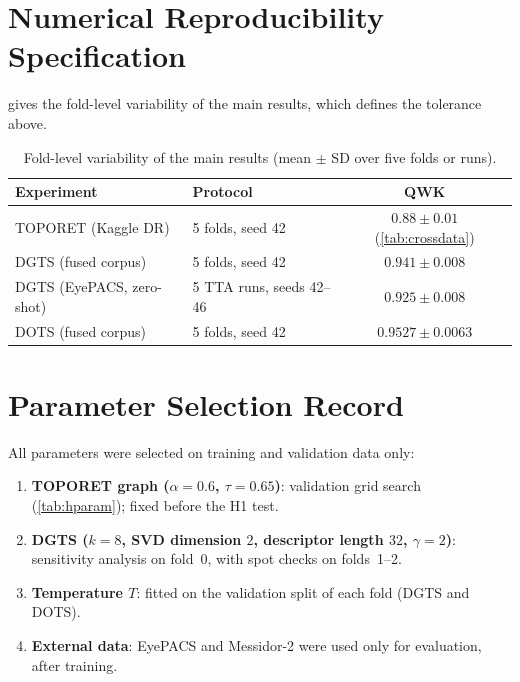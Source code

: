 \section{Numerical Reproducibility Specification}
\label{sec:numrepro}
 gives the fold-level variability of the main results, which defines the
tolerance above.

\begin{table}[!htbp]
\centering
\caption[Fold-level variability of the main results]{Fold-level variability of the main
results (mean $\pm$ SD over five folds or runs).}
\label{tab:seeds}
\small
\begin{tabular}{@{}llc@{}}
\toprule
Experiment & Protocol & QWK \\
\midrule
TOPORET (Kaggle DR) & 5 folds, seed 42 & $0.88\pm0.01$ (\cref{tab:crossdata}) \\
DGTS (fused corpus) & 5 folds, seed 42 & $0.941\pm0.008$ \\
DGTS (EyePACS, zero-shot) & 5 TTA runs, seeds 42--46 & $0.925\pm0.008$ \\
DOTS (fused corpus) & 5 folds, seed 42 & $0.9527\pm0.0063$ \\
\bottomrule
\end{tabular}
\end{table}

\section{Parameter Selection Record}
\label{sec:paramrecord}
All parameters were selected on training and validation data only:
\begin{enumerate}
\item \textbf{TOPORET graph ($\alpha=0.6$, $\tau=0.65$)}: validation grid search
(\cref{tab:hparam}); fixed before the H1 test.
\item \textbf{DGTS ($k=8$, SVD dimension $2$, descriptor length $32$, $\gamma=2$)}:
sensitivity analysis on fold~0, with spot checks on folds~1--2.
\item \textbf{Temperature $T$}: fitted on the validation split of each fold (DGTS and DOTS).
\item \textbf{External data}: EyePACS and Messidor-2 were used only for evaluation, after
training.
\end{enumerate}

